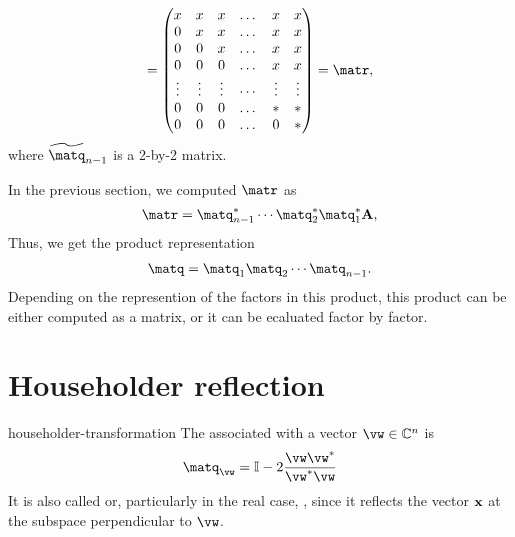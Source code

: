 \begin{intro}
\begin{gather}
    =
    \begin{pmatrix}
      x & x & x & \dots & x & x \\
      0 & x & x & \dots & x & x \\
      0 & 0 & x & \dots & x & x \\
      0 & 0 & 0 & \dots & x & x \\
      \vdots & \vdots & \vdots & \cdots & \vdots & \vdots \\
      0 & 0 & 0 & \dots & * & * \\
      0 & 0 & 0 & \dots & 0 & * \\
    \end{pmatrix} = \matr,
  \end{gather}
  where $\widetilde\matq_{n-1}$ is a 2-by-2 matrix.
\end{intro}

\begin{intro}
  \label{sec:ortho:qr:q-product}
  In the previous section, we computed $\matr$ as
  \begin{gather}
    \matr = \matq_{n-1}^* \cdots \matq_{2}^*\matq_{1}^*\mata,
  \end{gather}
  Thus, we get the product representation
  \begin{gather}
    \matq = \matq_{1} \matq_{2} \cdots \matq_{n-1}.
  \end{gather}
  Depending on the represention of the factors in this product, this
  product can be either computed as a matrix, or it can be ecaluated
  factor by factor.
\end{intro}

\section{Householder reflection}

\begin{Definition}{householder-transformation}
  The 
  associated with a vector $\vw\in\C^n$ is
  \begin{gather}
    \matq_{\vw} = \id - 2\frac{\vw\vw^*}{\vw^*\vw}
  \end{gather}
  It is also called  or, particularly in
  the real case, , since it reflects
  the vector $\mathbf x$ at the subspace perpendicular to $\vw$.
\end{Definition}

